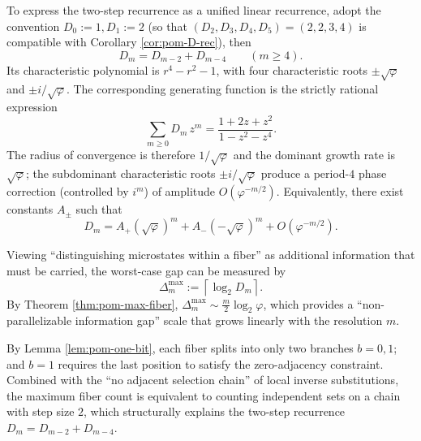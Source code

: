 \begin{remark}\label{rem:pom-D-generating-function}
To express the two-step recurrence as a unified linear recurrence, adopt the convention \(D_0:=1,D_1:=2\) (so that \((D_2,D_3,D_4,D_5)=(2,2,3,4)\) is compatible with Corollary \ref{cor:pom-D-rec}), then
\[
D_m=D_{m-2}+D_{m-4}\qquad(m\ge 4).
\]
Its characteristic polynomial is \(r^{4}-r^{2}-1\), with four characteristic roots \(\pm\sqrt{\varphi}\) and \(\pm i/\sqrt{\varphi}\).
The corresponding generating function is the strictly rational expression
\[
\sum_{m\ge 0} D_m\,z^m=\frac{1+2z+z^{2}}{1-z^{2}-z^{4}}.
\]
The radius of convergence is therefore \(1/\sqrt{\varphi}\) and the dominant growth rate is \(\sqrt{\varphi}\); the subdominant characteristic roots \(\pm i/\sqrt{\varphi}\) produce a period-\(4\) phase correction (controlled by \(i^m\)) of amplitude \(O(\varphi^{-m/2})\).
Equivalently, there exist constants \(A_\pm\) such that
\[
D_m=A_+(\sqrt{\varphi})^{m}+A_-(-\sqrt{\varphi})^{m}+O(\varphi^{-m/2}).
\]
\end{remark}

\begin{remark}\label{rem:pom-D-delay}
Viewing ``distinguishing microstates within a fiber'' as additional information that must be carried, the worst-case gap can be measured by
\[
\Delta_m^{\max}:=\left\lceil \log_2 D_m\right\rceil.
\]
By Theorem \ref{thm:pom-max-fiber},
\(
\Delta_m^{\max}\sim \frac{m}{2}\log_2\varphi
\), which provides a ``non-parallelizable information gap'' scale that grows linearly with the resolution $m$.
\end{remark}

\begin{remark}\label{rem:pom-overflow-rec}
By Lemma \ref{lem:pom-one-bit}, each fiber splits into only two branches $b=0,1$; and $b=1$ requires the last position to satisfy the zero-adjacency constraint. Combined with the ``no adjacent selection chain'' of local inverse substitutions, the maximum fiber count is equivalent to counting independent sets on a chain with step size $2$, which structurally explains the two-step recurrence $D_m=D_{m-2}+D_{m-4}$.
\end{remark}





